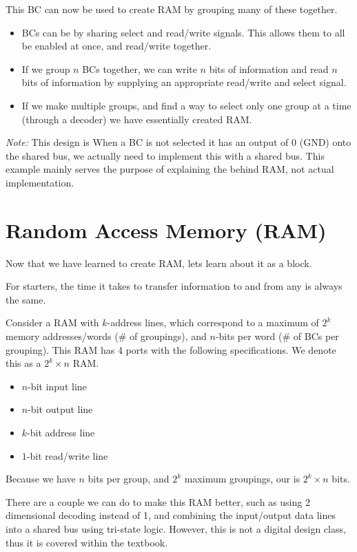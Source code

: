 This BC can now be used to create RAM by grouping many of these together.
\begin{itemize}
	\item BCs can be  by sharing select and read/write signals. This allows them to all be enabled at once, and read/write together.
	\item If we group $n$ BCs together, we can write $n$ bits of information and read $n$ bits of information by supplying an appropriate read/write and select signal.
	\item If we make multiple groups, and find a way to select only one group at a time (through a decoder) we have essentially created RAM.
\end{itemize} 
{\itshape Note:} This design is  When a BC is not selected it has an output of 0 (GND) onto the shared bus, we actually need  to implement this with a shared bus. This example mainly serves the purpose of explaining the  behind RAM, not actual implementation.

\section{Random Access Memory (RAM)}
Now that we have learned to create RAM, lets learn about it as a block. 

For starters, the time it takes to transfer information to and from any  is always the same.

Consider a RAM with $k$-address lines, which correspond to a maximum of $2^k$ memory addresses/words (\# of groupings), and $n$-bits per word (\# of BCs per grouping). This RAM has 4 ports with the following specifications. We denote this as a $2^k \times n$ RAM.
\begin{itemize}
	\item $n$-bit input line
	\item $n$-bit output line
	\item $k$-bit address line
	\item $1$-bit read/write line
\end{itemize}
Because we have $n$ bits per group, and $2^k$ maximum groupings, our  is $2^k \times n$ bits. 

There are a couple  we can do to make this RAM better, such as using 2 dimensional decoding instead of 1, and combining the input/output data lines into a shared bus using tri-state logic. However, this is not a digital design class, thus it is covered within the textbook.

